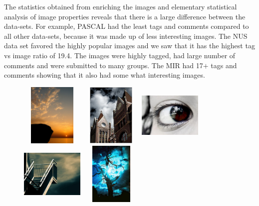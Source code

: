 The statistics obtained from enriching the images and elementary
statistical analysis of image properties reveals that there is a
large difference between the data-sets. For example, PASCAL had the least
tags and comments compared to all other data-sets, because it was made
up of less interesting images. The NUS data set favored the highly
popular images and we saw that it has the highest tag vs image
ratio of 19.4. The images were highly tagged, had large number of
comments and were submitted to many groups. The MIR had 17$+$ tags
and comments showing that it also had some what interesting images.

\begin{center}
\begin{figure}
\centering
\includegraphics[width=3cm, height=3cm]{./Pictures/CLEF/1.jpg}
\includegraphics[width=3cm, height=3cm]{./Pictures/CLEF/2.jpg}
\includegraphics[width=3cm, height=3cm]{./Pictures/CLEF/3.jpg} \\
\includegraphics[width=3cm, height=3cm]{./Pictures/CLEF/4.jpg}
\includegraphics[width=3cm, height=3cm]{./Pictures/CLEF/5.jpg}

\end{figure}
\end{center}
